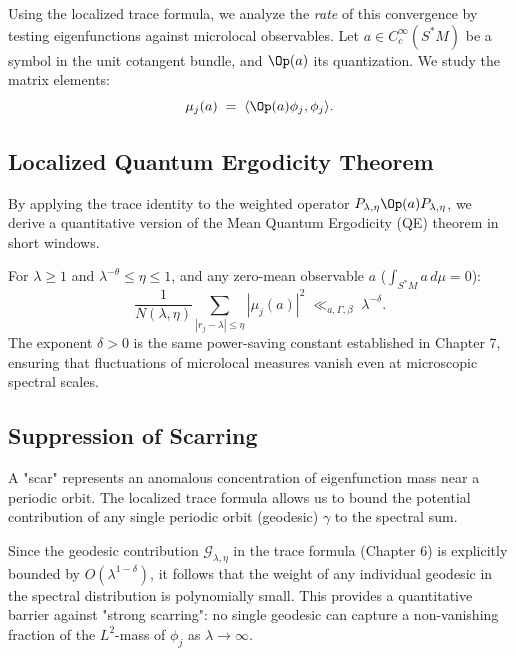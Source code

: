 Using the localized trace formula, we analyze the \emph{rate} of this convergence by testing eigenfunctions against microlocal observables. Let $a \in C_c^\infty(S^*M)$ be a symbol in the unit cotangent bundle, and $\Op(a)$ its quantization. We study the matrix elements:
\begin{equation}\label{eq:matrix-element}
\mu_j(a) \;=\; \langle \Op(a) \phi_j, \phi_j \rangle.
\end{equation}

\subsection{Localized Quantum Ergodicity Theorem}

By applying the trace identity to the weighted operator $P_{\lambda, \eta} \Op(a) P_{\lambda, \eta}$, we derive a quantitative version of the Mean Quantum Ergodicity (QE) theorem in short windows.

\begin{theorem}\label{thm:local-qe}
For $\lambda \ge 1$ and $\lambda^{-\theta} \le \eta \le 1$, and any zero-mean observable $a$ ($\int_{S^*M} a \, d\mu = 0$):
\begin{equation}\label{eq:qe-variance}
\frac{1}{N(\lambda, \eta)} \sum_{|r_j - \lambda| \le \eta} |\mu_j(a)|^2 \;\ll_{a, \Gamma, \beta}\; \lambda^{-\delta}.
\end{equation}
The exponent $\delta > 0$ is the same power-saving constant established in Chapter 7, ensuring that fluctuations of microlocal measures vanish even at microscopic spectral scales.
\end{theorem}

\subsection{Suppression of Scarring}

A "scar" represents an anomalous concentration of eigenfunction mass near a periodic orbit. The localized trace formula allows us to bound the potential contribution of any single periodic orbit (geodesic) $\gamma$ to the spectral sum.

Since the geodesic contribution $\mathcal{G}_{\lambda, \eta}$ in the trace formula (Chapter 6) is explicitly bounded by $O(\lambda^{1-\delta})$, it follows that the weight of any individual geodesic in the spectral distribution is polynomially small. This provides a quantitative barrier against "strong scarring": no single geodesic can capture a non-vanishing fraction of the $L^2$-mass of $\phi_j$ as $\lambda \to \infty$.

